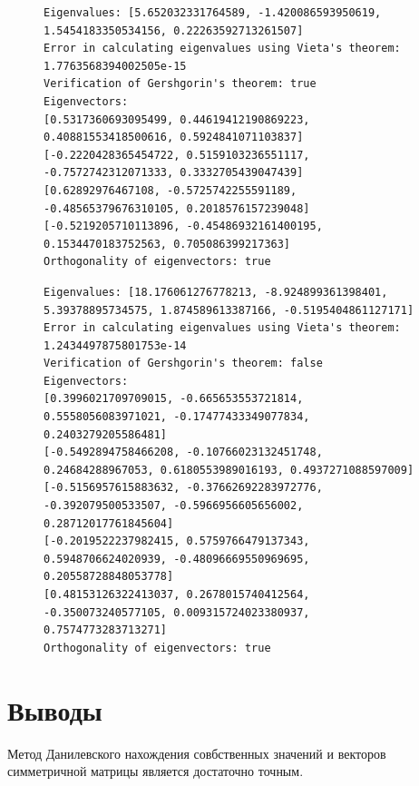 \documentclass[a4paper, 14pt]{extarticle}
\begin{document}
\begin{figure}[!htb]
\begin{lstlisting}[caption={Результат работы программы},label={lst:code4}]
Eigenvalues: [5.652032331764589, -1.420086593950619, 1.5454183350534156, 0.22263592713261507]
Error in calculating eigenvalues using Vieta's theorem: 1.7763568394002505e-15
Verification of Gershgorin's theorem: true
Eigenvectors:
[0.5317360693095499, 0.44619412190869223, 0.40881553418500616, 0.5924841071103837]
[-0.2220428365454722, 0.5159103236551117, -0.7572742312071333, 0.3332705439047439]
[0.62892976467108, -0.5725742255591189, -0.48565379676310105, 0.2018576157239048]
[-0.5219205710113896, -0.45486932161400195, 0.1534470183752563, 0.705086399217363]
Orthogonality of eigenvectors: true
\end{lstlisting}
\end{figure}
\begin{figure}[!htb]
\begin{lstlisting}[caption={Результат работы программы},label={lst:code5}]
Eigenvalues: [18.176061276778213, -8.924899361398401, 5.39378895734575, 1.874589613387166, -0.5195404861127171]
Error in calculating eigenvalues using Vieta's theorem: 1.2434497875801753e-14
Verification of Gershgorin's theorem: false
Eigenvectors:
[0.3996021709709015, -0.665653553721814, 0.5558056083971021, -0.17477433349077834, 0.2403279205586481]
[-0.5492894758466208, -0.10766023132451748, 0.24684288967053, 0.6180553989016193, 0.4937271088597009]
[-0.5156957615883632, -0.37662692283972776, -0.392079500533507, -0.5966956605656002, 0.28712017761845604]
[-0.2019522237982415, 0.5759766479137343, 0.5948706624020939, -0.48096669550969695, 0.20558728848053778]
[0.48153126322413037, 0.2678015740412564, -0.350073240577105, 0.009315724023380937, 0.7574773283713271]
Orthogonality of eigenvectors: true
\end{lstlisting}
\end{figure}

\section{Выводы}\label{Sect::conclusion}

Метод Данилевского нахождения совбственных значений и векторов симметричной матрицы является достаточно точным.
\end{document}
